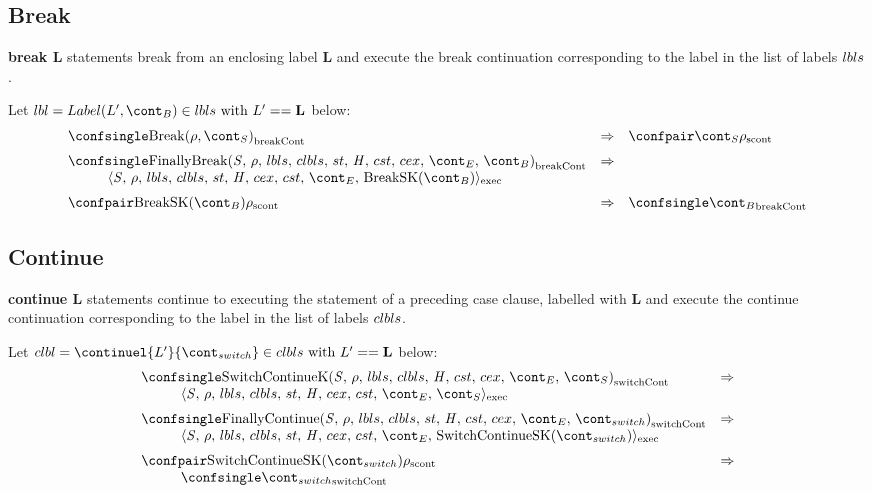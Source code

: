 \documentclass{article}
\begin{document}
\subsection{Break}
\textbf{break L} statements break from an enclosing label \textbf{L} and execute the break continuation corresponding to the label in the list of labels $lbls$.

Let $\lbl = Label(L', \bcont) \in \lbls \textrm{ with } L' == \mathbf{L}$ below:
\[
  \begin{array}{lcl}
	\breakconf{\mathrm{Break}(\env, \scont)}
	& \Rightarrow &
	\scontconf{\scont}{\env}\\[2mm]

	\breakconf{\finallybreak{\stmt}{\bcont}}
	& \Rightarrow \\
	\hspace{10mm}\execconf{\stmt}{\env}{\lbls}{\clbls}{\handler}{\cex}{\cstrace}{\econt}{\mathrm{BreakSK}(\bcont)}\\[2mm]

	\scontconf{\mathrm{BreakSK}(\bcont)}{\env}
	& \Rightarrow &
	\breakconf{\bcont}

  \end{array}
\]

\subsection{Continue}
\textbf{continue L} statements continue to executing the statement of a preceding case clause, labelled with \textbf{L} and execute the continue continuation corresponding to the label in the list of labels $clbls$.

Let $\clbl = \continuel{L'}{\switchcont} \in \clbls \textrm{ with } L' == \mathbf{L}$ below:
\[
  \begin{array}{lcl}
	\switchconf{\continuek}
	& \Rightarrow \\
	\hspace{10mm}\execconf{\stmt}{\env}{\lbls}{\clbls}{\handler}{\cex}{\cstrace}{\econt}{\scont}\\[2mm]

	\switchconf{\FinallyContinue{\stmt}{\switchcont}}
	& \Rightarrow \\
	\hspace{10mm}\execconf{\stmt}{\env}{\lbls}{\clbls}{\handler}{\cex}{\cstrace}{\econt}{\mathrm{SwitchContinueSK}(\switchcont)}\\[2mm]

	\scontconf{\mathrm{SwitchContinueSK}(\switchcont)}{\env}
	& \Rightarrow \\
	\hspace{10mm}\switchconf{\switchcont}
  \end{array}
\]
\end{document}
